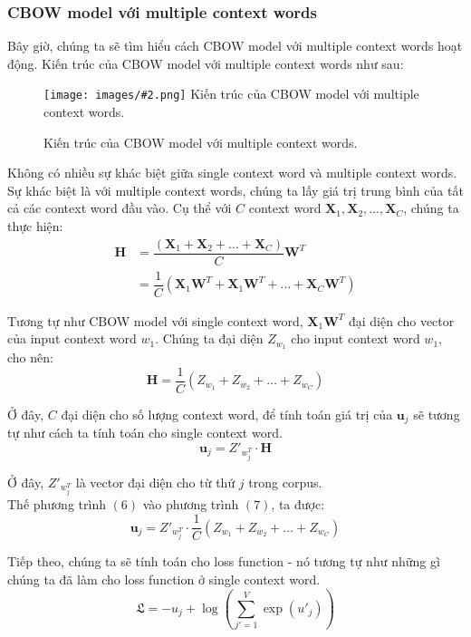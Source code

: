 \documentclass[12pt]{article}
\newcommand{\includeImage}[3]{
\begin{figure}[H]
  \centering
  \texttt{[image: images/\#2.png]}
  \def\temp{#3}\ifx\temp\empty\else\caption{#3}\fi
\end{figure}}
\begin{document}
\subsubsection{CBOW model với multiple context words}
Bây giờ, chúng ta sẽ tìm hiểu cách CBOW model với multiple context words hoạt động. Kiến trúc của CBOW model với multiple context words như sau:

\includeImage{1}{08}{Kiến trúc của CBOW model với multiple context words.}

\indent Không có nhiều sự khác biệt giữa single context word và multiple context words. Sự khác biệt là với multiple context words, chúng ta lấy giá trị trung bình của tất cả các context word đầu vào. Cụ thể với $C$ context word $\boldsymbol{X}_1, \boldsymbol{X}_2, \hdots, \boldsymbol{X}_C$, chúng ta thực hiện:
$$\begin{aligned}\boldsymbol{H} &= \dfrac{(\boldsymbol{X}_1 + \boldsymbol{X}_2 + \hdots + \boldsymbol{X}_C)}{C} \boldsymbol{W}^T \\ &= \dfrac{1}{C}(\boldsymbol{X}_1 \boldsymbol{W}^T + \boldsymbol{X}_1 \boldsymbol{W}^T + \hdots + \boldsymbol{X}_C \boldsymbol{W}^T) \end{aligned}$$

\indent Tương tự như CBOW model với single context word, $\boldsymbol{X}_1 \boldsymbol{W}^T$ đại diện cho vector của input context word $w_1$. Chúng ta đại diện $Z_{w_1}$ cho input context word $w_1$, cho nên:
\begin{equation}\boldsymbol{H} = \dfrac{1}{C} (Z_{w_1} + Z_{w_2} + \hdots + Z_{w_C})\end{equation}

\indent Ở đây, $C$ đại diện cho số lượng context word, để tính toán giá trị của $\boldsymbol{u}_j$ sẽ tương tự như cách ta tính toán cho single context word.
\begin{equation}
  \boldsymbol{u}_j = Z'_{w_j^T} \cdot \boldsymbol{H}
\end{equation}

\indent Ở đây, $Z'_{w_j^T}$ là vector đại diện cho từ thứ $j$ trong corpus.\\

\indent Thế phương trình $(6)$ vào phương trình $(7)$, ta được:
$$\boldsymbol{u}_j = Z'_{w_j^T} \cdot \dfrac{1}{C} (Z_{w_1} + Z_{w_2} + \hdots + Z_{w_C})$$

\indent Tiếp theo, chúng ta sẽ tính toán cho loss function - nó tương tự như những gì chúng ta đã làm cho loss function ở single context word.
$$\mathfrak{L} = -u_j + \log{\left ( \sum_{j'=1}^V \exp{(u'_j)} \right )}$$
\end{document}
